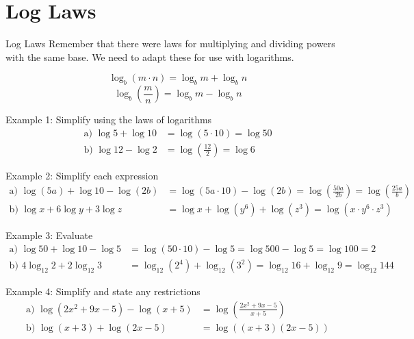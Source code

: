 \documentclass{article}
\begin{document}
\section{Log Laws}

\begin{lessonbox}{Log Laws}
Remember that there were laws for multiplying and dividing powers with the same base. We need to adapt these for use with logarithms.

\[
\log_b(m \cdot n) = \log_b{m} + \log_b{n}
\]
\[
\log_b\left(\frac{m}{n}\right) = \log_b{m} - \log_b{n}
\]
\end{lessonbox}

\begin{examplebox}{Example 1: Simplify using the laws of logarithms}
\begin{align*}
    \text{a) } \log{5} + \log{10} &= \log{(5 \cdot 10)} = \log{50}\\
    \text{b) } \log{12} - \log{2} &= \log{\left(\frac{12}{2}\right)} = \log{6}
\end{align*}
\end{examplebox}

\begin{examplebox}{Example 2: Simplify each expression}
\begin{align*}
    \text{a) } \log{(5a)} + \log{10} - \log{(2b)} &= \log{(5a \cdot 10)} - \log{(2b)} = \log{\left(\frac{50a}{2b}\right)} = \log{\left(\frac{25a}{b}\right)}\\
    \text{b) } \log{x} + 6 \log{y} + 3 \log{z} &= \log{x} + \log{(y^6)} + \log{(z^3)} = \log{(x \cdot y^6 \cdot z^3)}
\end{align*}
\end{examplebox}

\begin{examplebox}{Example 3: Evaluate}
\begin{align*}
    \text{a) } \log{50} + \log{10} - \log{5} &= \log{(50 \cdot 10)} - \log{5} = \log{500} - \log{5} = \log{100} = 2\\
    \text{b) } 4 \log_{12}{2} + 2 \log_{12}{3} &= \log_{12}{(2^4)} + \log_{12}{(3^2)} = \log_{12}{16} + \log_{12}{9} = \log_{12}{144}
\end{align*}
\end{examplebox}

\begin{examplebox}{Example 4: Simplify and state any restrictions}
\begin{align*}
    \text{a) } \log{(2x^2 + 9x - 5)} - \log{(x + 5)} &= \log{\left(\frac{2x^2 + 9x - 5}{x + 5}\right)}\\
    \text{b) } \log{(x+3)} + \log{(2x-5)} &= \log{((x+3)(2x-5))}
\end{align*}
\end{examplebox}
\end{document}
